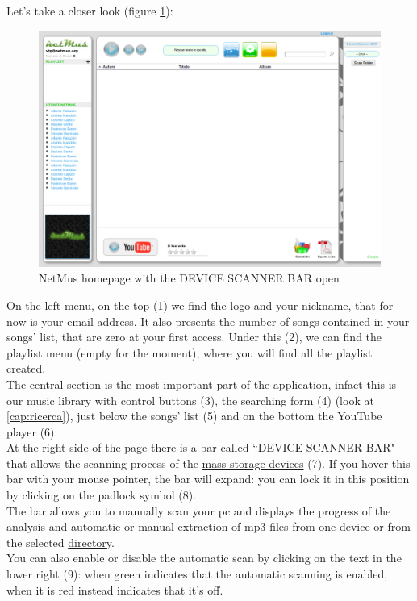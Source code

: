 Let's take a closer look (figure \ref{fig:appletbarAperta}):\\
\begin{figure}[!htbp]
  \centering
  \includegraphics[width=14cm]{img/MU/applet_bar_open.png}
\caption{NetMus homepage with the DEVICE SCANNER BAR open}
\label{fig:appletbarAperta}
\end{figure} 

On the left menu, on the top (1) we find the  logo and
your \underline{nickname}, that for now is your email address. It also presents
the number of songs contained in your songs' list, that are zero at your first
access. Under this (2), we can find the playlist menu (empty for the moment),
where you will find all the playlist created.\\

The central section is the most important part of the application, infact this
is our music library with control buttons (3), the searching form (4) (look at
\ref{cap:ricerca}), just below the songs' list (5) and on the bottom the
YouTube player (6).\\

At the right side of the page there is a bar called ``DEVICE SCANNER BAR" that
allows the scanning process of the \underline{mass storage devices} (7). If you
hover this bar with your mouse pointer, the bar will expand: you can lock it in
this position by clicking on the padlock symbol (8).\\
The bar allows you to manually scan your pc and displays the progress of the
analysis and automatic or manual extraction of mp3 files from one device or from
the selected \underline{directory}.\\
You can also enable or disable the automatic scan by clicking on the text in the
lower right (9): when green indicates that the
automatic scanning is enabled, when it is red instead indicates that it's
off.

